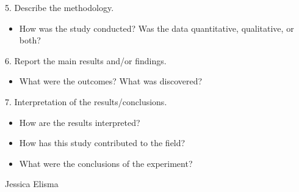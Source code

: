 5. Describe the methodology.

\begin{itemize}
\item
  How was the study conducted? Was the data quantitative, qualitative,
  or both?
\end{itemize}

6. Report the main results and/or findings.

\begin{itemize}
\item
  What were the outcomes? What was discovered?
\end{itemize}

7. Interpretation of the results/conclusions.

\begin{itemize}
\item
  How are the results interpreted?
\item
  How has this study contributed to the field?
\item
  What were the conclusions of the experiment?
\end{itemize}

Jessica Elisma
